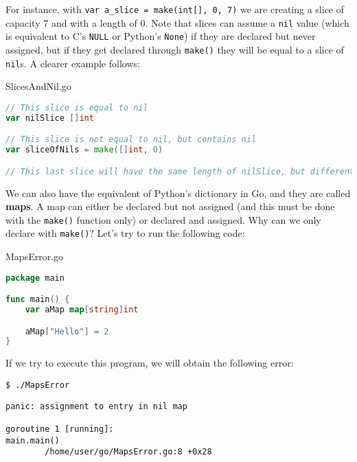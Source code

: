 \pagebreak
For instance, with \verb|var a_slice = make(int[], 0, 7)| we are creating a slice of capacity 7 and with a length of 0. Note that slices can assume a \verb|nil| value (which is equivalent to C's \verb|NULL| or Python's \verb|None|) if they are declared but never assigned, but if they get declared through \verb|make()| they will be equal to a slice of \verb|nil|s. A clearer example follows:

\begin{codeblock}{SlicesAndNil.go}
    \begin{lstlisting}[language = go]
// This slice is equal to nil
var nilSlice []int

// This slice is not equal to nil, but contains nil
var sliceOfNils = make([]int, 0)

// This last slice will have the same length of nilSlice, but different content\end{lstlisting}
\end{codeblock}

We can also have the equivalent of Python's dictionary in Go, and they are called \textbf{maps}. A map can either be declared but not assigned (and this must be done with the \verb|make()| function only) or declared and assigned. Why can we only declare with \verb|make()|? Let's try to run the following code:

\begin{codeblock}{MapsError.go}
    \begin{lstlisting}[language = go]
package main

func main() {
    var aMap map[string]int

    aMap["Hello"] = 2
}
    \end{lstlisting}
\end{codeblock}

If we try to execute this program, we will obtain the following error:

\begin{terminal}
    \begin{lstlisting}[style = notexterm]
 $ ./MapsError
    \end{lstlisting}
    \begin{tcolorbox}
        \begin{lstlisting}[basewidth=0.44em, numbers=none]
panic: assignment to entry in nil map

goroutine 1 [running]:
main.main()
        /home/user/go/MapsError.go:8 +0x28\end{lstlisting}
    \end{tcolorbox}
\end{terminal}

